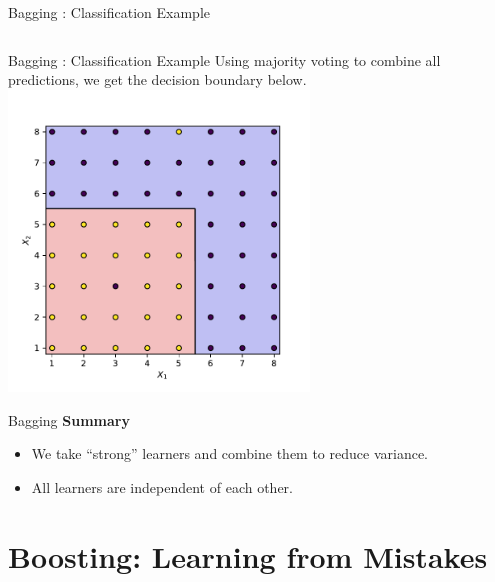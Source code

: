 \documentclass[8pt]{beamer}
\newcommand{\fitpic}[1]{\begin{adjustbox}{max width=\linewidth, max totalheight=0.78\textheight}#1\end{adjustbox}}
\begin{document}
\begin{frame}{Bagging : Classification Example}
\begin{columns}
\begin{column}{0.3\textwidth}
    \end{column}

  \end{columns}
\end{frame}

\begin{frame}{Bagging : Classification Example}
  Using majority voting to combine all predictions, we get the decision boundary below.\\
  \vspace{0.5cm}
  \centering
  \fitpic{\includegraphics[width = 0.6\textwidth]{../assets/ensemble/figures/decision-boundary-ensemble}}
\end{frame}

\begin{frame}{Bagging}
  \textbf{Summary}
  \begin{itemize}
    \item We take ``strong'' learners and combine them to reduce variance.
    \item All learners are independent of each other.
  \end{itemize}
\end{frame}

\section{Boosting: Learning from Mistakes}
\end{document}
